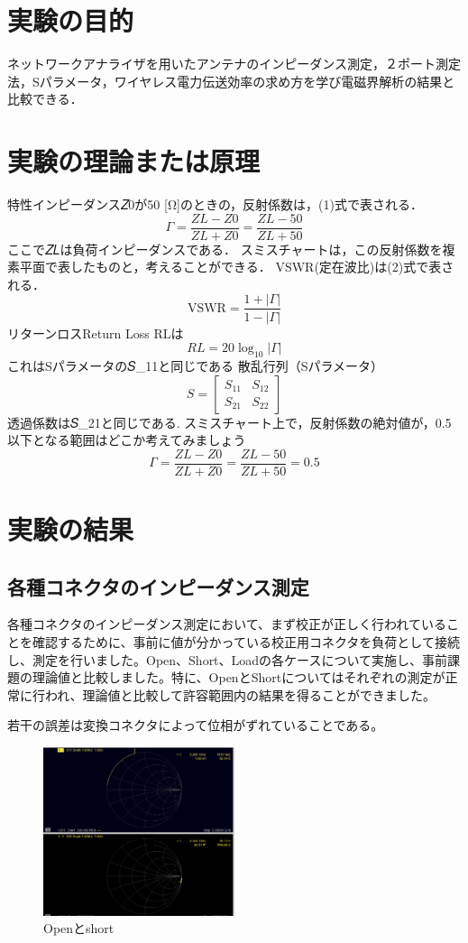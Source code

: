 \documentclass[a4paper,11pt,xelatex,ja=standard]{bxjsarticle}
\begin{document}
\section{実験の目的}
    ネットワークアナライザを用いたアンテナのインピーダンス測定，２ポート測定法，Sパラメータ，ワイヤレス電力伝送効率の求め方を学び電磁界解析の結果と比較できる．

\section{実験の理論または原理}
    特性インピーダンス𝑍0が50 [Ω]のときの，反射係数は，(1)式で表される．
    \[\Gamma = \frac{𝑍𝐿−𝑍0}{𝑍𝐿+𝑍0} = \frac{𝑍𝐿−50}{𝑍𝐿+50} \tag{1}\]
    ここで𝑍𝐿は負荷インピーダンスである．
    スミスチャートは，この反射係数を複素平面で表したものと，考えることができる．
    VSWR(定在波比)は(2)式で表される．
    \[\text{VSWR} = \frac{1+|\Gamma|}{1−|\Gamma|} \tag{2}\]
    リターンロスReturn Loss RLは
    \[𝑅𝐿 = 20\log_{10}|\Gamma| \tag{3}\]
    これはSパラメータの𝑆_{11}と同じである
    散乱行列（Sパラメータ）
    \[𝑆 = \begin{bmatrix}𝑆_{11} & 𝑆_{12} \\𝑆_{21} & 𝑆_{22}\end{bmatrix}\]
    透過係数は𝑆_{21}と同じである.
    スミスチャート上で，反射係数の絶対値が，0.5以下となる範囲はどこか考えてみましょう
    \[\Gamma = \frac{𝑍𝐿− 𝑍0}{𝑍𝐿 + 𝑍0} = \frac{𝑍𝐿− 50}{𝑍𝐿 + 50} = 0.5\]

\section{実験の結果}
    \subsection{各種コネクタのインピーダンス測定}
        各種コネクタのインピーダンス測定において、まず校正が正しく行われていることを確認するために、事前に値が分かっている校正用コネクタを負荷として接続し、測定を行いました。Open、Short、Loadの各ケースについて実施し、事前課題の理論値と比較しました。特に、OpenとShortについてはそれぞれの測定が正常に行われ、理論値と比較して許容範囲内の結果を得ることができました。

        若干の誤差は変換コネクタによって位相がずれていることである。

        \begin{figure}[H]
            \centering
            \includegraphics[width=0.5\textwidth]{./img/24-3/1.png}
            \caption{Openとshort}
        \end{figure}
\end{document}
